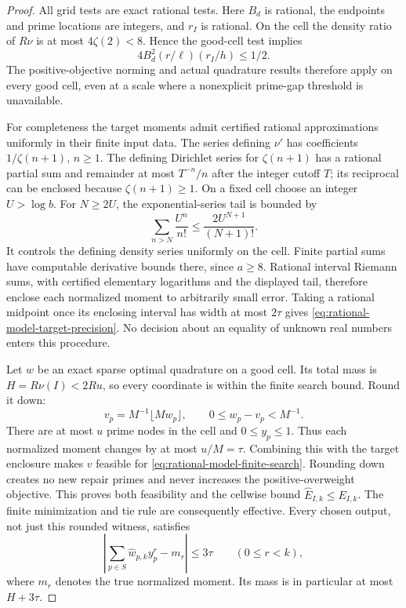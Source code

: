 \documentclass[11pt]{article}
\theoremstyle{definition}
\begin{document}
\begin{proof}
All grid tests are exact rational tests. Here $B_d$ is rational,
the endpoints and prime locations are integers, and $r_I$ is
rational. On the cell the density ratio of $R\nu$ is at most
$4\zeta(2)<8$. Hence the good-cell test implies
\[
 4B_d^2(r/\ell)(r_I/h)\le1/2.
\]
The positive-objective norming and actual quadrature results
therefore apply on every good cell, even at a scale where
a nonexplicit prime-gap threshold is unavailable.

For completeness the target moments admit certified rational
approximations uniformly in their finite input data.
The series defining $\nu'$ has coefficients
$1/\zeta(n+1)$, $n\ge1$. The defining Dirichlet series for
$\zeta(n+1)$ has a rational partial sum and remainder at most
$T^{-n}/n$ after the integer cutoff $T$; its reciprocal can
be enclosed because $\zeta(n+1)\ge1$.
On a fixed cell choose an integer $U>\log b$.
For $N\ge2U$, the exponential-series tail is bounded by
\[
 \sum_{n>N}\frac{U^n}{n!}
                  \le\frac{2U^{N+1}}{(N+1)!}.
\]
It controls the defining density series uniformly on the
cell. Finite partial sums have computable derivative bounds
there, since $a\ge8$. Rational interval Riemann sums, with
certified elementary logarithms and the displayed tail,
therefore enclose each normalized moment to arbitrarily
small error. Taking a rational midpoint once its enclosing
interval has width at most $2\tau$ gives
\eqref{eq:rational-model-target-precision}.
No decision about an equality of unknown real numbers enters
this procedure.

Let $w$ be an exact sparse optimal quadrature on a good cell.
Its total mass is $H=R\nu(I)<2Ru$, so every coordinate is
within the finite search bound. Round it down:
\[
 v_p=M^{-1}\lfloor Mw_p\rfloor,\qquad
                  0\le w_p-v_p<M^{-1}.
\]
There are at most $u$ prime nodes in the cell and
$0\le y_p\le1$. Thus each normalized moment changes by
at most $u/M=\tau$. Combining this with the target enclosure
makes $v$ feasible for \eqref{eq:rational-model-finite-search}.
Rounding down creates no new repair primes and never increases
the positive-overweight objective. This proves both feasibility
and the cellwise bound
$\widehat E_{I,k}\le E_{I,k}$.
The finite minimization and tie rule are consequently effective.
Every chosen output, not just this rounded witness, satisfies
\begin{equation}
 \left|\sum_{p\in S}\widehat w_{p,k}y_p^r-m_r\right|
                \le3\tau\qquad(0\le r<k),
 \label{eq:rational-model-actual-moment-error}
\end{equation}
where $m_r$ denotes the true normalized moment.
Its mass is in particular at most $H+3\tau$.


\end{proof}
\end{document}

